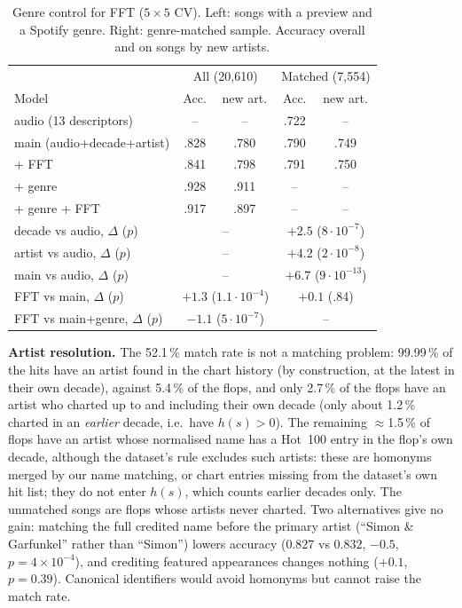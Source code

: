 \begin{table}[!htbp]
\centering
\caption{Genre control for FFT ($5{\times}5$ CV). Left: songs with a preview and a Spotify
genre. Right: genre-matched sample. Accuracy overall and on songs by new artists.}
\label{tab:genre}
\setlength{\tabcolsep}{3pt}
\begin{tabular}{lcccc}
\toprule
& \multicolumn{2}{c}{All (20{,}610)} & \multicolumn{2}{c}{Matched (7{,}554)} \\
Model & Acc. & new art. & Acc. & new art. \\
\midrule
audio (13 descriptors) & -- & -- & .722 & -- \\
main (audio+decade+artist) & .828 & .780 & .790 & .749 \\
\quad + FFT & .841 & .798 & .791 & .750 \\
\quad + genre & .928 & .911 & -- & -- \\
\quad + genre + FFT & .917 & .897 & -- & -- \\
\midrule
decade vs audio, $\Delta$ ($p$) & \multicolumn{2}{c}{--} & \multicolumn{2}{c}{$+2.5$ ($8{\cdot}10^{-7}$)} \\
artist vs audio, $\Delta$ ($p$) & \multicolumn{2}{c}{--} & \multicolumn{2}{c}{$+4.2$ ($2{\cdot}10^{-8}$)} \\
main vs audio, $\Delta$ ($p$) & \multicolumn{2}{c}{--} & \multicolumn{2}{c}{$+6.7$ ($9{\cdot}10^{-13}$)} \\
FFT vs main, $\Delta$ ($p$) & \multicolumn{2}{c}{$+1.3$ ($1.1{\cdot}10^{-4}$)} & \multicolumn{2}{c}{$+0.1$ (.84)} \\
FFT vs main+genre, $\Delta$ ($p$) & \multicolumn{2}{c}{$-1.1$ ($5{\cdot}10^{-7}$)} & \multicolumn{2}{c}{--} \\
\bottomrule
\end{tabular}
\end{table}

\textbf{Artist resolution.} The 52.1\,\% match rate is not a matching problem: 99.99\,\%
of the hits have an artist found in the chart history (by construction, at the latest in their own decade),
against 5.4\,\% of the flops, and only 2.7\,\% of the flops have an artist who charted up to and including their
own decade (only about 1.2\,\% charted in an \emph{earlier} decade, i.e.\ have $h(s)>0$). The remaining
$\approx$1.5\,\% of flops have an artist whose normalised name has a Hot~100 entry in the flop's own decade,
although the dataset's rule excludes such artists: these are homonyms merged by our name matching, or chart
entries missing from the dataset's own hit list; they do not enter $h(s)$, which counts earlier decades only.
The unmatched songs are flops whose artists never charted. Two alternatives give
no gain: matching the full credited name before the primary artist (``Simon \&
Garfunkel'' rather than ``Simon'') lowers accuracy ($0.827$ vs $0.832$, $-0.5$\pp,
$p=4\times10^{-4}$), and crediting featured appearances changes nothing ($+0.1$\pp,
$p=0.39$). Canonical identifiers would avoid homonyms but cannot raise the match rate.

